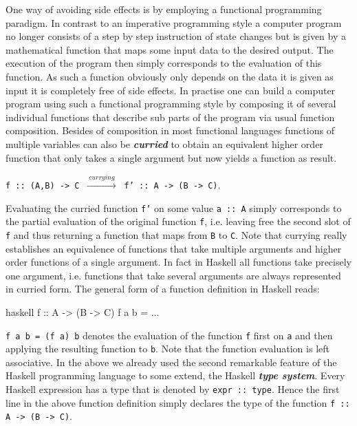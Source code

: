 \documentclass[a4paper,12pt, DIV=14, BCOR=5mm, twoside, headsepline]{scrbook}
\begin{document}
One way of avoiding side effects is by employing a functional programming paradigm. In contrast to an imperative programming style a computer program no longer consists of a step by step instruction of state changes but is given by a mathematical function that maps some input data to the desired output. The execution of the program then simply corresponds to the evaluation of this function. As such a function obviously only depends on the data it is given as input it is completely free of side effects. In practise one can build a computer program using such a functional programming style by composing it of several individual functions that describe sub parts of the program via usual function composition. Besides of composition in most functional languages functions of multiple variables can also be  \textit{\textbf{curried}} to obtain an equivalent higher order function that only takes a single argument but now yields a function as result. 
\begin{center}
    \texttt{f :: (A,B) -> C} $\ \xrightarrow{ \ currying \ } \ $
    \texttt{f' :: A -> (B -> C)}.
\end{center}
Evaluating the curried function \texttt{f'} on some value \texttt{a :: A} simply corresponds to the partial evaluation of the original function \texttt{f}, i.e. leaving free the second slot of \texttt{f} and thus returning a function that maps from \texttt{B}  to \texttt{C}. Note that currying really establishes an equivalence of functions that take multiple arguments and higher order functions of a single argument.
In fact in Haskell all functions take precisely one argument, i.e. functions that take several arguments are always represented in curried form. The general form of a function definition in Haskell reads:
\begin{center}
\begin{cminted}{haskell}
f :: A -> (B -> C)
f a b = ...  
\end{cminted}
\end{center}
\texttt{f a b = (f a) b} denotes the evaluation of the function \texttt{f} first on \texttt{a} and then applying the resulting function to \texttt{b}. Note that the function evaluation is left associative.
In the above we already used the second remarkable feature of the  Haskell programming language to some extend, the Haskell \textbf{\textit{type system}}. Every Haskell expression has a type that is denoted by \texttt{expr :: type}. Hence the first line in the above function definition simply declares   the type of the function \texttt{f :: A -> (B -> C)}.
\end{document}
